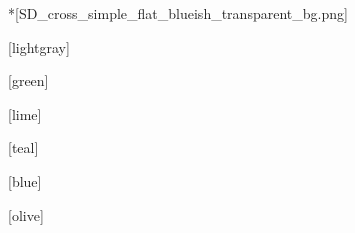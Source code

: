 
\newcommand{\subbooktitle}{o Livro Verde}





  
  \imprintpage

  \toc

  \setcounter{chapter}{0}

  *[SD_cross_simple_flat_blueish_transparent_bg.png]
    

  [lightgray]
    \begin{songs}{}
      
    \end{songs}

  [green]
    \begin{songs}{}
      
    \end{songs}

  [lime]
    \begin{songs}{}
      
    \end{songs}

  [teal]
    \begin{songs}{}
      
    \end{songs}

  [blue]
    \begin{songs}{}
      
    \end{songs}

  [olive]
    \begin{songs}{}
      
    \end{songs}

